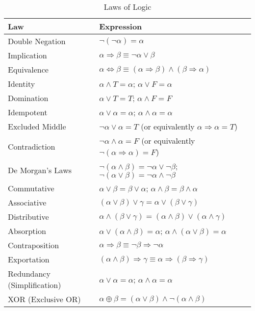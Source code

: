 \documentclass[oneside,11pt,dvipsnames]{book}
\renewcommand{\implies}{\Rightarrow}
\begin{document}
\begin{table}
    \caption{Laws of Logic}\label{tab:logic_laws}
    \centering
    \begin{tabular}{lp{10cm}}
    \toprule
    \textbf{Law} & \textbf{Expression} \\ 
    \midrule
    Double Negation & \(\neg (\neg \alpha) = \alpha\) \\     
    Implication & \(\alpha \implies \beta \equiv \neg \alpha \lor \beta\) \\ 
    Equivalence & \(\alpha \iff \beta \equiv (\alpha \implies \beta) \land (\beta \implies \alpha)\) \\ 
    Identity & \(\alpha \land T = \alpha\); \(\alpha \lor F = \alpha\) \\ 
    Domination & \(\alpha \lor T = T\); \(\alpha \land F = F\) \\ 
    Idempotent & \(\alpha \lor \alpha = \alpha\); \(\alpha \land \alpha = \alpha\) \\ 
    Excluded Middle & \( \neg  \alpha \lor\alpha = T\) (or equivalently \(\alpha \implies \alpha = T\))\\
    Contradiction & \( \neg \alpha \land \alpha = F\) (or equivalently \(\neg (\alpha \implies \alpha) = F\))\\    
    De Morgan's Laws & \(\neg (\alpha \land \beta) = \neg \alpha \lor \neg \beta\); \(\neg (\alpha \lor \beta) = \neg \alpha \land \neg \beta\) \\ 
    Commutative & \(\alpha \lor \beta = \beta \lor \alpha\); \(\alpha \land \beta = \beta \land \alpha\) \\ 
    Associative & \((\alpha \lor \beta) \lor \gamma = \alpha \lor (\beta \lor \gamma)\) \\ 
    Distributive & \(\alpha \land (\beta \lor \gamma) = (\alpha \land \beta) \lor (\alpha \land \gamma)\) \\ 
    Absorption & \(\alpha \lor (\alpha \land \beta) = \alpha\); \(\alpha \land (\alpha \lor \beta) = \alpha\) \\ 
    Contraposition & \(\alpha \implies \beta \equiv \neg \beta \implies \neg \alpha\) \\ 
    Exportation & \((\alpha \land \beta) \implies \gamma \equiv \alpha \implies (\beta \implies \gamma)\) \\ 
    Redundancy (Simplification) & \(\alpha \lor \alpha = \alpha\); \(\alpha \land \alpha = \alpha\) \\ 
    XOR (Exclusive OR) & \(\alpha \oplus \beta = (\alpha \lor \beta) \land \neg (\alpha \land \beta)\) \\ 
    \bottomrule
    \end{tabular}
\end{table}
    
\end{document}

